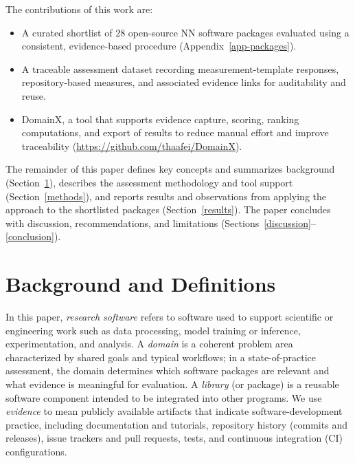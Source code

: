 \documentclass[final,1p,times,authoryear,12pt]{elsarticle}
\providecommand{\wss}[1]{\textcolor{blue}{\textit{#1}}}
\begin{document}
The contributions of this work are:
\begin{itemize}
  \item A curated shortlist of 28 open-source NN software packages evaluated using a consistent, evidence-based procedure (Appendix~\ref{app-packages}).
  \item A traceable assessment dataset recording measurement-template responses, repository-based measures, and associated evidence links for auditability and reuse.
  \item DomainX, a tool that supports evidence capture, scoring, ranking computations, and export of results to reduce manual effort and improve traceability (\url{https://github.com/thaafei/DomainX}).
\end{itemize}

The remainder of this paper defines key concepts and summarizes background (Section~\ref{background}), describes the assessment methodology and tool support (Section~\ref{methods}), 
and reports results and observations from applying the approach to the shortlisted packages (Section~\ref{results}).
 The paper concludes with discussion, recommendations, and limitations (Sections~\ref{discussion}--\ref{conclusion}).

\section{Background and Definitions} \label{background}


In this paper, \emph{research software} refers to software used to support scientific or engineering work such as data processing,
 model training or inference, experimentation, and analysis. A \emph{domain} is a coherent problem area characterized by 
 shared goals and typical workflows; in a state-of-practice assessment, the domain determines which software packages are 
 relevant and what evidence is meaningful for evaluation. A \emph{library} (or package) is a reusable software component intended
  to be integrated into other programs. We use \emph{evidence} to mean publicly available artifacts that indicate software-development
   practice, including documentation and tutorials, repository history (commits and releases), issue trackers and pull requests,
    tests, and continuous integration (CI) configurations.
\end{document}
